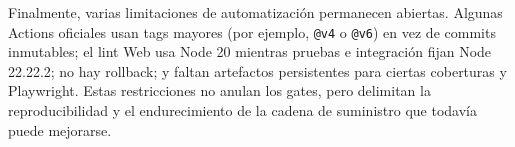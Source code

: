Finalmente, varias limitaciones de automatización permanecen abiertas. Algunas
Actions oficiales usan tags mayores (por ejemplo, \texttt{@v4} o \texttt{@v6})
en vez de commits inmutables; el lint Web usa Node 20 mientras pruebas e
integración fijan Node 22.22.2; no hay rollback; y faltan artefactos persistentes
para ciertas coberturas y Playwright. Estas restricciones no anulan los gates,
pero delimitan la reproducibilidad y el endurecimiento de la cadena de
suministro que todavía puede mejorarse.
